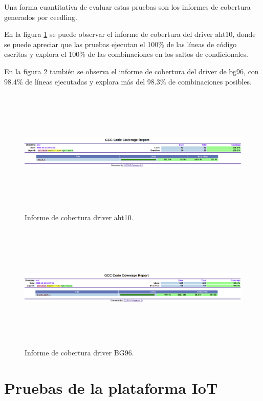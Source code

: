 Una forma cuantitativa de evaluar estas pruebas son los informes de cobertura generados por ceedling.

En la figura \ref{fig:Cobertura aht10} se puede observar el informe de cobertura del driver aht10, donde se puede apreciar que las pruebas ejecutan el 100\% de las líneas de código escritas y explora el 100\% de las combinaciones en los saltos de condicionales.

En la figura \ref{fig:Cobertura BG96} también se observa el informe de cobertura del driver de bg96, con 98.4\% de líneas ejecutadas y explora más del 98.3\% de combinaciones posibles. 

\begin{figure}[h!]
    \centering
      \includegraphics[width=\linewidth, height=6cm]{./Figures/cobertura_aht10.png}
    \caption{Informe de cobertura driver aht10.}
      \label{fig:Cobertura aht10}
  \end{figure}

\begin{figure}[htbp!]
    \centering
      \includegraphics[width=\linewidth, height=6cm]{./Figures/cobertura_bg96.png}
    \caption{Informe de cobertura driver BG96.}
      \label{fig:Cobertura BG96}
\end{figure}

\section{Pruebas de la plataforma IoT}
